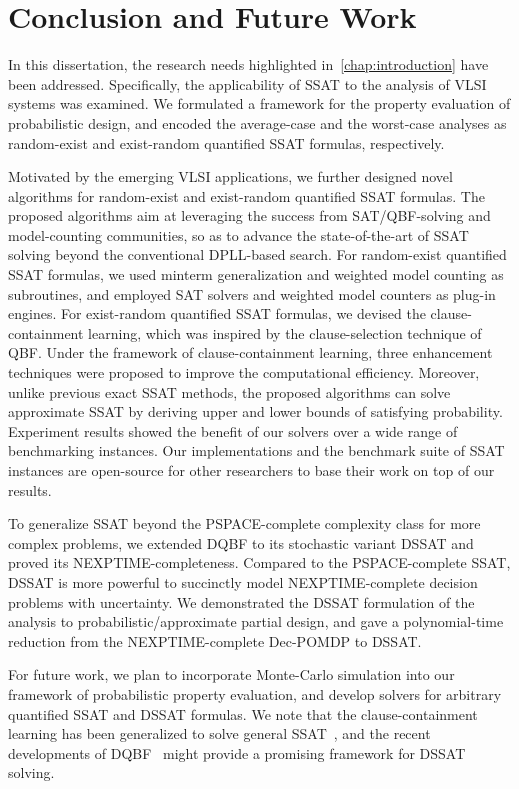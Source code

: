 \chapter{Conclusion and Future Work}
\label{chap:conclusion-future-work}

In this dissertation,
the research needs highlighted in~\cref{chap:introduction} have been addressed.
Specifically,
the applicability of SSAT to the analysis of VLSI systems was examined.
We formulated a framework for the property evaluation of probabilistic design,
and encoded the average-case and the worst-case analyses
as random-exist and exist-random quantified SSAT formulas, respectively.

Motivated by the emerging VLSI applications,
we further designed novel algorithms for random-exist and exist-random quantified SSAT formulas.
The proposed algorithms aim at leveraging the success from SAT/QBF-solving and model-counting communities,
so as to advance the state-of-the-art of SSAT solving beyond the conventional DPLL-based search.
For random-exist quantified SSAT formulas,
we used minterm generalization and weighted model counting as subroutines,
and employed SAT solvers and weighted model counters as plug-in engines.
For exist-random quantified SSAT formulas,
we devised the clause-containment learning,
which was inspired by the clause-selection technique of QBF.
Under the framework of clause-containment learning,
three enhancement techniques were proposed to improve the computational efficiency.
Moreover, unlike previous exact SSAT methods,
the proposed algorithms can solve approximate SSAT by deriving upper and lower bounds of satisfying probability.
Experiment results showed the benefit of our solvers over a wide range of benchmarking instances.
Our implementations and the benchmark suite of SSAT instances are open-source
for other researchers to base their work on top of our results.

To generalize SSAT beyond the PSPACE-complete complexity class for more complex problems,
we extended DQBF to its stochastic variant DSSAT and proved its NEXPTIME-completeness.
Compared to the PSPACE-complete SSAT,
DSSAT is more powerful to succinctly model NEXPTIME-complete decision problems with uncertainty.
We demonstrated the DSSAT formulation of the analysis to probabilistic/approximate partial design,
and gave a polynomial-time reduction from the NEXPTIME-complete Dec-POMDP to DSSAT.

For future work,
we plan to incorporate Monte-Carlo simulation into our framework of probabilistic property evaluation,
and develop solvers for arbitrary quantified SSAT and DSSAT formulas.
We note that the clause-containment learning has been generalized to solve general SSAT~\cite{Chen2021},
and the recent developments of DQBF~\cite{Tentrup2019} might provide a promising framework for DSSAT solving.


